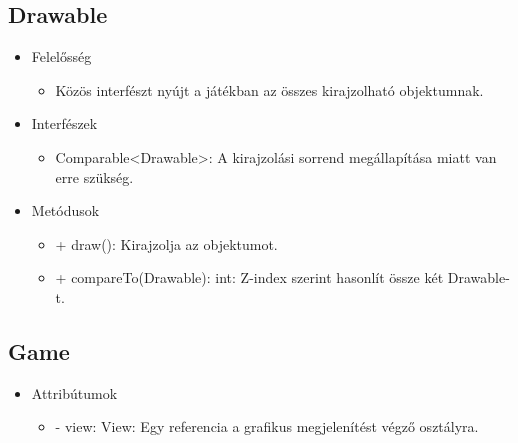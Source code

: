 \subsection{Drawable}
\begin{itemize}
\item Felelősség
\begin{itemize}
	\item Közös interfészt nyújt a játékban az összes kirajzolható objektumnak.
\end{itemize}
\item Interfészek
\begin{itemize}
	\item Comparable<Drawable>: A kirajzolási sorrend megállapítása miatt van erre szükség.
\end{itemize}
\item Metódusok
	\begin{itemize}
		\item + draw(): Kirajzolja az objektumot.
		\item + compareTo(Drawable): int: Z-index szerint hasonlít össze két Drawable-t.
	\end{itemize}
\end{itemize}

\subsection{Game}
\begin{itemize}
\item Attribútumok
	\begin{itemize}
		\item - view: View: Egy referencia a grafikus megjelenítést végző osztályra.
	\end{itemize}
\end{itemize}

